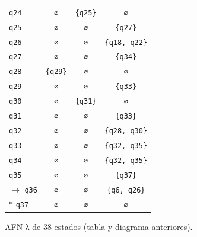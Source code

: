 \documentclass[11pt]{article}
\begin{document}
\begin{center}
\begin{tabular}{lccc}
 \texttt{q24} & \texttt{∅} & \texttt{\{q25\}} & \texttt{∅} \\
 \texttt{q25} & \texttt{∅} & \texttt{∅} & \texttt{\{q27\}} \\
 \texttt{q26} & \texttt{∅} & \texttt{∅} & \texttt{\{q18, q22\}} \\
 \texttt{q27} & \texttt{∅} & \texttt{∅} & \texttt{\{q34\}} \\
 \texttt{q28} & \texttt{\{q29\}} & \texttt{∅} & \texttt{∅} \\
 \texttt{q29} & \texttt{∅} & \texttt{∅} & \texttt{\{q33\}} \\
 \texttt{q30} & \texttt{∅} & \texttt{\{q31\}} & \texttt{∅} \\
 \texttt{q31} & \texttt{∅} & \texttt{∅} & \texttt{\{q33\}} \\
 \texttt{q32} & \texttt{∅} & \texttt{∅} & \texttt{\{q28, q30\}} \\
 \texttt{q33} & \texttt{∅} & \texttt{∅} & \texttt{\{q32, q35\}} \\
 \texttt{q34} & \texttt{∅} & \texttt{∅} & \texttt{\{q32, q35\}} \\
 \texttt{q35} & \texttt{∅} & \texttt{∅} & \texttt{\{q37\}} \\
$\to$ \texttt{q36} & \texttt{∅} & \texttt{∅} & \texttt{\{q6, q26\}} \\
$*$ \texttt{q37} & \texttt{∅} & \texttt{∅} & \texttt{∅} \\
\bottomrule\end{tabular}\end{center}

\resp AFN-λ de 38 estados (tabla y diagrama anteriores).
\end{document}
